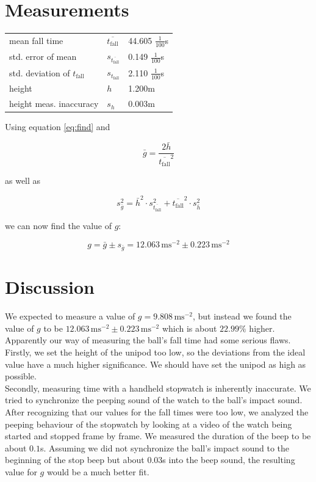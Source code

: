 \documentclass{scrreprt}
\newcommand{\unit}[1]{\ensuremath{\, \mathrm{#1}}}
\begin{document}
\section{Measurements}


\begin{center}
    \begin{tabular}{l l l}
	mean fall time & $\overline{t_{\text{fall}}}$ & 44.605 $\frac{1}{100}$s\\
	std. error of mean & $s_{\overline{t_{\text{fall}}}}$ & 0.149 $\frac{1}{100}$s\\
	std. deviation of $t_{\text{fall}}$ & $s_{t_{\text{fall}}}$ & 2.110 $\frac{1}{100}$s\\
	height & $h$ & 1.200m\\
	height meas. inaccuracy & $s_h$ & 0.003m   
    \end{tabular}
\end{center}

Using equation \ref{eq:find} and 

\begin{equation}
\bar{g} = \frac{2 \bar{h}}{\overline{t_{\text{fall}}}^2}
\end{equation}

as well as 

\begin{equation}
s_{\bar{g}}^2 = \bar{h}^2 \cdot s_{\overline{t_{\text{fall}}}}^2 + \overline{t_{\text{fall}}}^2 \cdot s_{\bar{h}}^2
\end{equation}

we can now find the value of $g$:

\begin{equation}
g = \bar{g} \pm s_{\bar{g}} = 12.063\unit{m s^{-2}} \pm 0.223\unit{m s^{-2}}
\end{equation}

\section{Discussion}
We expected to measure a value of $g = 9.808\unit{ms^{-2}}$, but instead we found the value of $g$ to be $12.063\unit{m s^{-2}} \pm 0.223\unit{m s^{-2}}$ which is about $22.99\%$ higher.\\
Apparently our way of measuring the ball's fall time had some serious flaws.\\
Firstly, we set the height of the unipod too low, so the deviations from the ideal value have a much higher significance. We should have set the unipod as high as possible.\\
Secondly, measuring time with a handheld stopwatch is inherently inaccurate. We tried to synchronize the peeping sound of the watch to the ball's impact sound. After recognizing that our values for the fall times were too low, we analyzed the peeping behaviour of the stopwatch by looking at a video of the watch being started and stopped frame by frame. We measured the duration of the beep to be about $0.1$s. Assuming we did not synchronize the ball's impact sound to the beginning of the stop beep but about $0.03$s into the beep sound, the resulting value for $g$ would be a much better fit.
\end{document}
